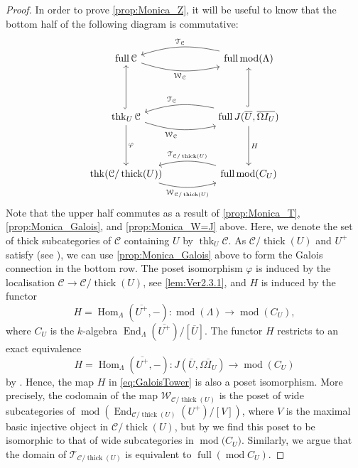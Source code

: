 \documentclass[10pt,twoside, a4paper,reqno]{amsart}
\DeclareMathOperator{\mods}{mod}
\DeclareMathOperator{\Hom}{Hom}
\DeclareMathOperator{\End}{End}
\DeclareMathOperator{\thick}{thick}
\DeclareMathOperator{\thicksubc}{thk}
\DeclareMathOperator{\fullsubc}{full}
\newcommand{\calC}{\mathcal{C}}
\newcommand{\calT}{\mathcal{T}}
\newcommand{\calW}{\mathcal{W}}
\theoremstyle{definition}
\begin{document}
\begin{proof}
   In order to prove \eqref{prop:Monica_Z}, it will be useful to know that the bottom half of the following diagram is commutative:
    \begin{equation}\label{eq:GaloisTower}
    	\begin{tikzcd}[row sep=4em]
	\fullsubc \calC \arrow[rr, bend right=15,"\calW_{\calC}"'] &  & {\fullsubc \mods(\Lambda)} \arrow[ll, bend right=15,"\calT_{\calC}"'] \\
\thicksubc_U \calC \arrow[d,"\varphi"] \arrow[rr, bend right=15,"\calW_{\calC}"'] \arrow[u,hook] &  & {\fullsubc J(\overline{U},\overline{\Omega I_{U}})} \arrow[d, "H"] \arrow[ll, bend right=15,"\calT_{\calC}"']  \arrow[u,hook]  \\
\thicksubc (\calC/\thick(U)) \arrow[rr, bend right=15,"\calW_{\calC/\thick(U)}"']   &  & \fullsubc \mods(C_U) \arrow[ll, bend right=15,"\calT_{\calC/\thick(U)}"']                                           
\end{tikzcd}
    \end{equation}
    Note that the upper half commutes as a result of \eqref{prop:Monica_T}, \eqref{prop:Monica_Galois}, and \eqref{prop:Monica_W=J} above.
      Here, we denote the set of thick subcategories of $\calC$ containing $U$ by $\thicksubc_U \calC$. As $\calC/\thick(U)$ and $U^+$ satisfy  (see ), we can use \eqref{prop:Monica_Galois} above to form the Galois connection in the bottom row. The poset isomorphism $\varphi$ is induced by the localisation $\calC \to \calC/\thick(U)$, see \cref{lem:Ver2.3.1}, and $H$ is induced by the functor
      \begin{equation}\label{eq:functorF}
       H = \Hom_{\Lambda}(\overline{U^+},-)\colon \mods(\Lambda) \to \mods(C_U),
      \end{equation}
      where $C_U$ is the $k$-algebra $\End_{\Lambda}(\overline{U^+})/[\overline{U}]$. The functor $H$ restricts to an exact equivalence 
      \begin{equation}\label{eq:equivF}
       H = \Hom_{\Lambda}(\overline{U^+},-)\colon J(\overline{U},\overline{\Omega I_{U}}) \to \mods(C_U)
      \end{equation}
      by \cite[Thm. 3.8]{Jas15} \cite[Thm. 4.12(b)]{DIRRT17}.
      Hence, the map $H$ in \eqref{eq:GaloisTower} is also a poset isomorphism. {More precisely, the codomain of the map $\calW_{\calC/\thick(U)}$ is the poset of wide subcategories of $\mods(\End_{\calC/\thick(U)}(U^+)/[V])$, where $V$ is the maximal basic injective object in $\calC/\thick(U)$, but by  we find this poset to be isomorphic to that of wide subcategories in $\mods{(}C_U{)}$. {Similarly, we argue that the domain of $\calT_{\calC/\thick(U)}$ is equivalent to $\fullsubc(\mods C_U)$.}}
      

\end{proof}
\end{document}
